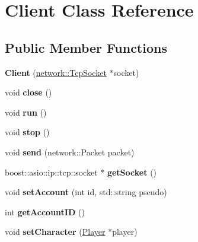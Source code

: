 \hypertarget{class_client}{\section{Client Class Reference}
\label{class_client}
}
\subsection*{Public Member Functions}
\begin{DoxyCompactItemize}
\item 
\hypertarget{class_client_a464760c1bd651656bdd73e12135d8e7c}{{\bfseries Client} (\hyperlink{classnetwork_1_1_tcp_socket}{network\-::\-Tcp\-Socket} $\ast$socket)}\label{class_client_a464760c1bd651656bdd73e12135d8e7c}

\item 
\hypertarget{class_client_a2ac4838875e743af25125d8b5c8eba09}{void {\bfseries close} ()}\label{class_client_a2ac4838875e743af25125d8b5c8eba09}

\item 
\hypertarget{class_client_ae0bc335d720265d4d6e8a72cf7a2a9aa}{void {\bfseries run} ()}\label{class_client_ae0bc335d720265d4d6e8a72cf7a2a9aa}

\item 
\hypertarget{class_client_a9e827b82efa67d7e334dcdde36d7ea87}{void {\bfseries stop} ()}\label{class_client_a9e827b82efa67d7e334dcdde36d7ea87}

\item 
\hypertarget{class_client_a408df34c316a2e5bb53580612fc5747a}{void {\bfseries send} (network\-::\-Packet packet)}\label{class_client_a408df34c316a2e5bb53580612fc5747a}

\item 
\hypertarget{class_client_a1c090469f173c4efeca71ada596c18e4}{boost\-::asio\-::ip\-::tcp\-::socket $\ast$ {\bfseries get\-Socket} ()}\label{class_client_a1c090469f173c4efeca71ada596c18e4}

\item 
\hypertarget{class_client_abc5eaf438006c3a74ad881408bec42a2}{void {\bfseries set\-Account} (int id, std\-::string pseudo)}\label{class_client_abc5eaf438006c3a74ad881408bec42a2}

\item 
\hypertarget{class_client_a8678bfa9c7fba44a372a40bd52a2fbb7}{int {\bfseries get\-Account\-I\-D} ()}\label{class_client_a8678bfa9c7fba44a372a40bd52a2fbb7}

\item 
\hypertarget{class_client_ab303cf2649bcb0f0c034e9698950c17e}{void {\bfseries set\-Character} (\hyperlink{class_player}{Player} $\ast$player)}\label{class_client_ab303cf2649bcb0f0c034e9698950c17e}


\end{DoxyCompactItemize}
